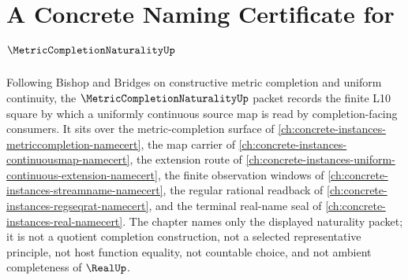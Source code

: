 \chapter{A Concrete Naming Certificate for $\MetricCompletionNaturalityUp$}
\label{ch:concrete-instances-metric-completion-naturality-namecert}

Following Bishop and Bridges on constructive metric completion and uniform continuity, the $\MetricCompletionNaturalityUp$ packet records the finite L10 square by which a uniformly continuous source map is read by completion-facing consumers. It sits over the metric-completion surface of \autoref{ch:concrete-instances-metriccompletion-namecert}, the map carrier of \autoref{ch:concrete-instances-continuousmap-namecert}, the extension route of \autoref{ch:concrete-instances-uniform-continuous-extension-namecert}, the finite observation windows of \autoref{ch:concrete-instances-streamname-namecert}, the regular rational readback of \autoref{ch:concrete-instances-regseqrat-namecert}, and the terminal real-name seal of \autoref{ch:concrete-instances-real-namecert}. The chapter names only the displayed naturality packet; it is not a quotient completion construction, not a selected representative principle, not host function equality, not countable choice, and not ambient completeness of $\RealUp$.

